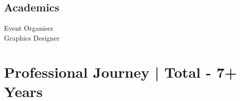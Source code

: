 \documentclass[a4paper]{deedy-resume-openfont}
\begin{document}
\begin{minipage}[t]{0.33\textwidth}
\subsection{Academics}
Event Organiser \\
Graphics Designer

%
%

\end{minipage} 
\hfill
\begin{minipage}[t]{0.66\textwidth} 

\section{Professional Journey |  \bf\fontsize{10}{15}\selectfont Total - 7+ Years}
\href{https://www.goldmansachs.com/}{}
\sectionsep
\href{https://www.danaher.com/}{}
\sectionsep
\href{https://www.ltimindtree.com/}{}
\sectionsep


\end{minipage}
\end{document}
